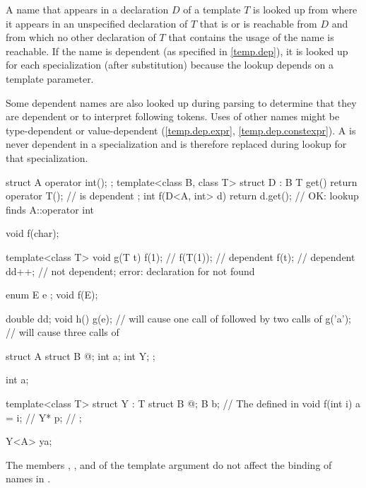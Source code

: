 \pnum
A name that appears in a declaration $D$ of a template $T$ is looked up
from where it appears
in an unspecified declaration of $T$ that is or is reachable from $D$ and
from which no other declaration of $T$
that contains the usage of the name is reachable.
If the name is dependent (as specified in \ref{temp.dep}),
it is looked up for each specialization (after substitution)
because the lookup depends on a template parameter.
\begin{note}
Some dependent names are also looked up during parsing to determine
that they are dependent or to interpret following \tcode{<} tokens.
Uses of other names might be type-dependent or value-dependent
(\ref{temp.dep.expr}, \ref{temp.dep.constexpr}).
A  is never dependent in a specialization and
is therefore replaced during lookup for that specialization.
\end{note}
\begin{example}
\begin{codeblock}
struct A { operator int(); };
template<class B, class T>
struct D : B {
  T get() { return operator T(); }      //  is dependent
};
int f(D<A, int> d) { return d.get(); }  // OK: lookup finds A::operator int
\end{codeblock}
\end{example}
\begin{example}
\begin{codeblock}
void f(char);

template<class T> void g(T t) {
  f(1);             // 
  f(T(1));          // dependent
  f(t);             // dependent
  dd++;             // not dependent; error: declaration for  not found
}

enum E { e };
void f(E);

double dd;
void h() {
  g(e);             // will cause one call of  followed by two calls of 
  g('a');           // will cause three calls of 
}
\end{codeblock}
\end{example}
\begin{example}
\begin{codeblock}
struct A {
  struct B { @\commentellip@ };
  int a;
  int Y;
};

int a;

template<class T> struct Y : T {
  struct B { @\commentellip@ };
  B b;                          // The  defined in 
  void f(int i) { a = i; }      // 
  Y* p;                         // 
};

Y<A> ya;
\end{codeblock}

The members , , and 
of the template argument 
do not affect the binding of names in .
\end{example}

